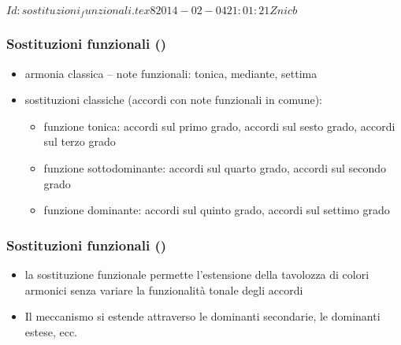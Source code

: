 %
%
\svnInfo $Id: sostituzioni_funzionali.tex 8 2014-02-04 21:01:21Z nicb $

\setcounter{ms}{0}
\begin{frame}
    \frametitle{Sostituzioni funzionali ()}
        
        \begin{itemize}

            \item armonia classica -- note funzionali: tonica, mediante, settima

            \item sostituzioni classiche (accordi con note funzionali in comune):

            \begin{itemize}

                \item funzione tonica: accordi sul primo grado,
                    accordi sul sesto grado, accordi sul terzo grado

                \item funzione sottodominante: accordi sul quarto grado,
                    accordi sul secondo grado

                \item funzione dominante: accordi sul quinto grado, accordi sul settimo grado

            \end{itemize}

        \end{itemize}

\end{frame}
            
\begin{frame}
    \frametitle{Sostituzioni funzionali ()}
        
        \begin{itemize}

            \item la sostituzione funzionale permette l'estensione della tavolozza
                di colori armonici senza variare la funzionalit\`a tonale degli accordi

            \item Il meccanismo si estende attraverso le dominanti secondarie,
                le dominanti estese, ecc.

        \end{itemize}

\end{frame}

